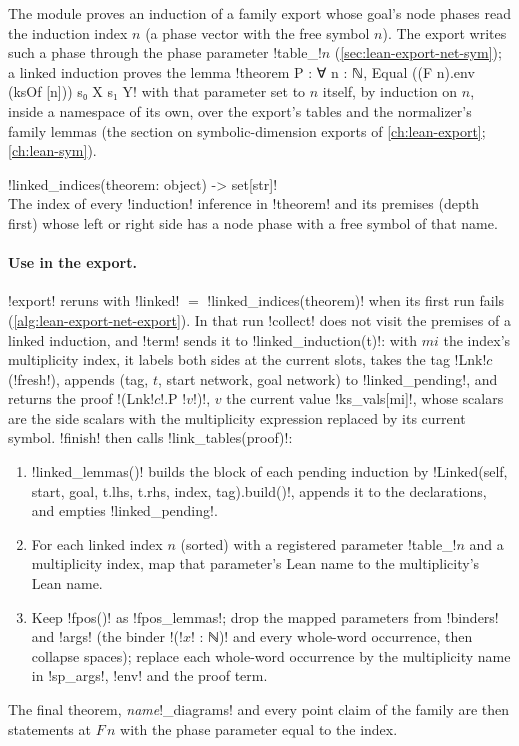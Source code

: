 {The module  proves an induction of a family export
whose goal's node phases read the induction index $n$ (a phase vector with the free symbol $n$).
The export writes such a phase through the phase parameter \code!table_!$n$
(\cref{sec:lean-export-net-sym}); a linked induction proves the lemma
\lean!theorem P : ∀ n : ℕ, Equal ((F n).env (ksOf [n])) s₀ X s₁ Y!
with that parameter set to $n$ itself, by induction on $n$, inside a namespace of its own, over
the export's tables and the normalizer's family lemmas (the section on symbolic-dimension
exports of \cref{ch:lean-export}; \cref{ch:lean-sym}).

\begin{signature}
\py!linked_indices(theorem: object) -> set[str]!\\
The index of every \code!induction! inference in \py!theorem! and its premises (depth first)
whose left or right side has a node phase with a free symbol of that name.
\end{signature}

\paragraph{Use in the export.} \py!export! reruns with \py!linked! $=$
\py!linked_indices(theorem)! when its first run fails (\cref{alg:lean-export-net-export}). In
that run \py!collect! does not visit the premises of a linked induction, and \py!term! sends it
to \py!linked_induction(t)!: with $mi$ the index's multiplicity index, it labels both sides at
the current slots, takes the tag \code!Lnk!$c$ (\py!fresh!), appends (tag, $t$, start network,
goal network) to \py!linked_pending!, and returns the proof
\code!(Lnk!$c$\code!.P !$v$\code!)!, $v$ the current value \py!ks_vals[mi]!, whose scalars are
the side scalars with the multiplicity expression replaced by its current symbol.
\py!finish! then calls \py!link_tables(proof)!:
\begin{enumerate}
\item \py!linked_lemmas()! builds the block of each pending induction by
  \py!Linked(self, start, goal, t.lhs, t.rhs, index, tag).build()!, appends it to the
  declarations, and empties \py!linked_pending!.
\item For each linked index $n$ (sorted) with a registered parameter \code!table_!$n$ and a
  multiplicity index, map that parameter's Lean name to the multiplicity's Lean name.
\item Keep \py!fpos()! as \py!fpos_lemmas!; drop the mapped parameters from \py!binders! and
  \py!args! (the binder \code!(!$x$\code! : ℕ)! and every whole-word occurrence, then collapse
  spaces); replace each whole-word occurrence by the multiplicity name in \py!sp_args!, \py!env!
  and the proof term.
\end{enumerate}
The final theorem, \textit{name}\code!_diagrams! and every point claim of the family are then
statements at $F\,n$ with the phase parameter equal to the index.

}
